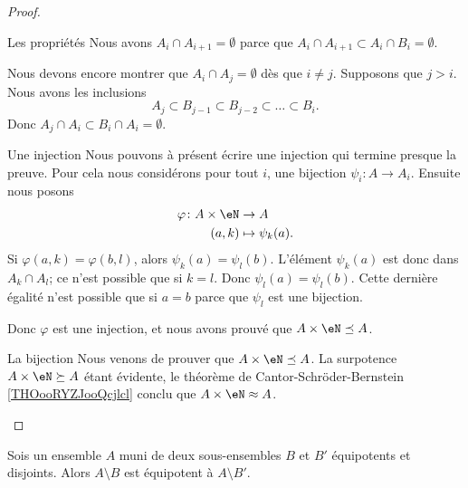 \begin{proof}
\begin{subproof}
        \item[Les propriétés]
            Nous avons \( A_i\cap A_{i+1}=\emptyset\) parce que \( A_i\cap A_{i+1}\subset A_i\cap B_i=\emptyset\).

            Nous devons encore montrer que \( A_i\cap A_j=\emptyset\) dès que \( i\neq j\). Supposons que \( j>i\). Nous avons les inclusions
            \begin{equation}
                A_j\subset B_{j-1}\subset B_{j-2}\subset \ldots \subset B_i.
            \end{equation}
            Donc \( A_j\cap A_i\subset B_i\cap A_i=\emptyset\).
        \item[Une injection]
            Nous pouvons à présent écrire une injection qui termine presque la preuve. Pour cela nous considérons pour tout \( i\), une bijection \( \psi_i\colon A\to A_i\). Ensuite nous posons
            \begin{equation}
                \begin{aligned}
                    \varphi\colon A\times \eN&\to A \\
                    (a,k)&\mapsto \psi_k(a). 
                \end{aligned}
            \end{equation}
                Si \( \varphi(a,k)=\varphi(b,l)\), alors \( \psi_k(a)=\psi_l(b)\). L'élément \( \psi_k(a)\) est donc dans \( A_k\cap A_l\); ce n'est possible que si \( k=l\). Donc \( \psi_l(a)=\psi_l(b)\). Cette dernière égalité n'est possible que si \( a=b\) parce que \( \psi_l\) est une bijection.
            
                Donc \( \varphi\) est une injection, et nous avons prouvé que \( A\times \eN\preceq A\).
            \item[La bijection]
                Nous venons de prouver que \( A\times \eN\preceq A\). La surpotence \( A\times \eN\succeq A\) étant évidente, le théorème de Cantor-Schröder-Bernstein \ref{THOooRYZJooQcjlcl} conclu que \( A\times \eN\approx A\).
    \end{subproof}
\end{proof}

\begin{lemma}        \label{LEMooDHWSooFqhano}
    Sois un ensemble \( A\) muni de deux sous-ensembles \( B\) et \( B'\) équipotents et disjoints. Alors \( A\setminus B\) est équipotent à \( A\setminus B'\).
\end{lemma}

